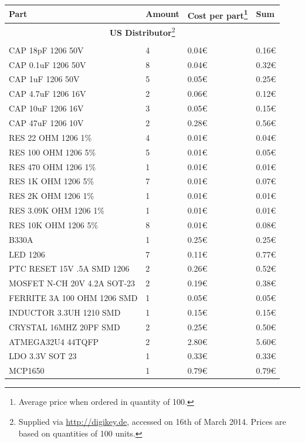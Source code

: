 \documentclass[11pt,a4paper]{article}
\begin{document}
\begin{longtable}{p{}p{}p{}p{}}
\toprule
Part & Amount & Cost per part\footnote{Average price when ordered in quantity of 100.} & Sum \\
\midrule
\multicolumn{4}{c}{\textbf{US Distributor}\footnote{Supplied via \url{http://digikey.de}, accessed on 16th of March 2014. Prices are based on quantities of 100 units.}}\\
\\
CAP 18pF 1206 50V & 4 & 0.04\euro & 0.16\euro \\ 
CAP 0.1uF 1206 50V & 8 & 0.04\euro & 0.32\euro \\
CAP 1uF 1206 50V & 5 & 0.05\euro & 0.25\euro \\
CAP 4.7uF 1206 16V & 2 & 0.06\euro & 0.12\euro \\
CAP 10uF 1206 16V & 3 & 0.05\euro & 0.15\euro \\
CAP 47uF 1206 10V & 2 & 0.28\euro & 0.56\euro \\
RES 22 OHM 1206 1\% & 4 &  0.01\euro & 0.04\euro \\
RES 100 OHM 1206 5\% & 5 & 0.01\euro & 0.05\euro \\
RES 470 OHM 1206 1\% & 1 & 0.01\euro & 0.01\euro \\
RES 1K OHM 1206 5\% & 7 & 0.01\euro & 0.07\euro \\
RES 2K OHM 1206 1\% & 1 & 0.01\euro & 0.01\euro \\
RES 3.09K OHM 1206 1\% & 1 & 0.01\euro & 0.01\euro \\
RES 10K OHM 1206 5\% & 8 & 0.01\euro & 0.08\euro \\
B330A & 1 & 0.25\euro & 0.25\euro \\
LED 1206 & 7 & 0.11\euro & 0.77\euro \\
PTC RESET 15V .5A SMD 1206 & 2 & 0.26\euro & 0.52\euro \\
MOSFET N-CH 20V 4.2A SOT-23 & 2 & 0.19\euro & 0.38\euro \\
FERRITE 3A 100 OHM 1206 SMD & 1 & 0.05\euro & 0.05\euro \\
INDUCTOR 3.3UH 1210 SMD & 1 & 0.15\euro & 0.15\euro \\
CRYSTAL 16MHZ 20PF SMD & 2 & 0.25\euro & 0.50\euro \\
ATMEGA32U4 44TQFP & 2 & 2.80\euro & 5.60\euro \\
LDO 3.3V SOT 23 & 1 & 0.33\euro & 0.33\euro \\ 
MCP1650 & 1 & 0.79\euro & 0.79\euro \\

\end{longtable}
\end{document}

